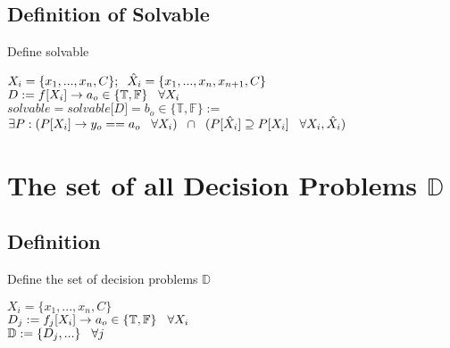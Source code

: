 \documentclass[11pt]{article}
\begin{document}
\subsection{Definition of Solvable}
Define solvable
\begin{center}
$
X_i = \{x_1,...,x_n,C\}; \hspace{2mm} \hat{X}_i = \{x_1,...,x_n,x_{n+1},C\}
$
\\ \vspace{2mm}
$
D := f \lbrack X_i \rbrack \rightarrow a_{o} \in \{\mathbb{T}, \mathbb{F}\} \hspace{3mm} \forall X_i
$
\\ \vspace{2mm}
$solvable = solvable \lbrack D \rbrack = b_o \in \{ \mathbb{T}, \mathbb{F} \} :=$
\\ \vspace{2mm}
$\exists P : (P \lbrack X_i \rbrack \rightarrow y_{o} == a_{o} \hspace{3mm} \forall X_i) \hspace{2mm} \cap \hspace{2mm} (P[\hat{X}_i] \supseteq P[X_i] \hspace{3mm} \forall X_i,\hat{X}_i)
$
\end{center}





\section{The set of all Decision Problems $\mathbb{D}$}

\subsection{Definition}
Define the set of decision problems $\mathbb{D}$
\begin{center}
$
X_i = \{x_1,...,x_n,C\}
$
\\ \vspace{2mm}
$
D_j := f_j \lbrack X_i \rbrack \rightarrow a_{o} \in \{\mathbb{T}, \mathbb{F}\} \hspace{3mm} \forall X_i
$
\\ \vspace{2mm}
$\mathbb{D} := \{D_j,...\} \hspace{3mm} \forall j$
\end{center}
\end{document}
